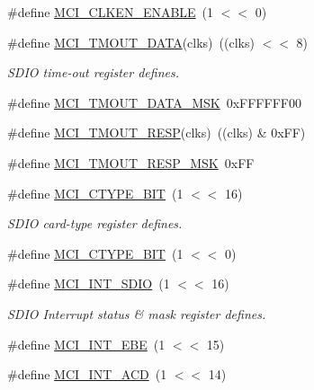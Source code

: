 \begin{DoxyCompactItemize}
\#define \hyperlink{group___s_d_i_f__18_x_x__43_x_x_ga3f98a58f6c153bb026ce5cd37e8501fd}{M\+C\+I\+\_\+\+C\+L\+K\+E\+N\+\_\+\+E\+N\+A\+B\+LE}~(1 $<$$<$ 0)
\item 
\#define \hyperlink{group___s_d_i_f__18_x_x__43_x_x_ga8900f4a7d5cff27938f5badde58e076e}{M\+C\+I\+\_\+\+T\+M\+O\+U\+T\+\_\+\+D\+A\+TA}(clks)~((clks) $<$$<$ 8)
\begin{DoxyCompactList}\small\item\em S\+D\+IO time-\/out register defines. \end{DoxyCompactList}\item 
\#define \hyperlink{group___s_d_i_f__18_x_x__43_x_x_ga2c3b6131d0cbecee604e7f3a143d9678}{M\+C\+I\+\_\+\+T\+M\+O\+U\+T\+\_\+\+D\+A\+T\+A\+\_\+\+M\+SK}~0x\+F\+F\+F\+F\+F\+F00
\item 
\#define \hyperlink{group___s_d_i_f__18_x_x__43_x_x_ga0bf7554fd10a3c4d9b9fe6efd5ce2692}{M\+C\+I\+\_\+\+T\+M\+O\+U\+T\+\_\+\+R\+E\+SP}(clks)~((clks) \& 0x\+F\+F)
\item 
\#define \hyperlink{group___s_d_i_f__18_x_x__43_x_x_gab24aea76935408ccc26206665b1399ff}{M\+C\+I\+\_\+\+T\+M\+O\+U\+T\+\_\+\+R\+E\+S\+P\+\_\+\+M\+SK}~0x\+FF
\item 
\#define \hyperlink{group___s_d_i_f__18_x_x__43_x_x_ga98abc9bb302389017c5e9bdd6c3daadc}{M\+C\+I\+\_\+\+C\+T\+Y\+P\+E\+\_\+B\+IT}~(1 $<$$<$ 16)
\begin{DoxyCompactList}\small\item\em S\+D\+IO card-\/type register defines. \end{DoxyCompactList}\item 
\#define \hyperlink{group___s_d_i_f__18_x_x__43_x_x_gab16364179eb12e9136ef99f48756bb3d}{M\+C\+I\+\_\+\+C\+T\+Y\+P\+E\+\_\+B\+IT}~(1 $<$$<$ 0)
\item 
\#define \hyperlink{group___s_d_i_f__18_x_x__43_x_x_ga3440597875ea66defc3d022e0fb05658}{M\+C\+I\+\_\+\+I\+N\+T\+\_\+\+S\+D\+IO}~(1 $<$$<$ 16)
\begin{DoxyCompactList}\small\item\em S\+D\+IO Interrupt status \& mask register defines. \end{DoxyCompactList}\item 
\#define \hyperlink{group___s_d_i_f__18_x_x__43_x_x_ga45a1e61dc2a02f1603da359344921818}{M\+C\+I\+\_\+\+I\+N\+T\+\_\+\+E\+BE}~(1 $<$$<$ 15)
\item 
\#define \hyperlink{group___s_d_i_f__18_x_x__43_x_x_ga19492b08b99b57b204e2d7e1df899b31}{M\+C\+I\+\_\+\+I\+N\+T\+\_\+\+A\+CD}~(1 $<$$<$ 14)
$$
\end{DoxyCompactItemize}
